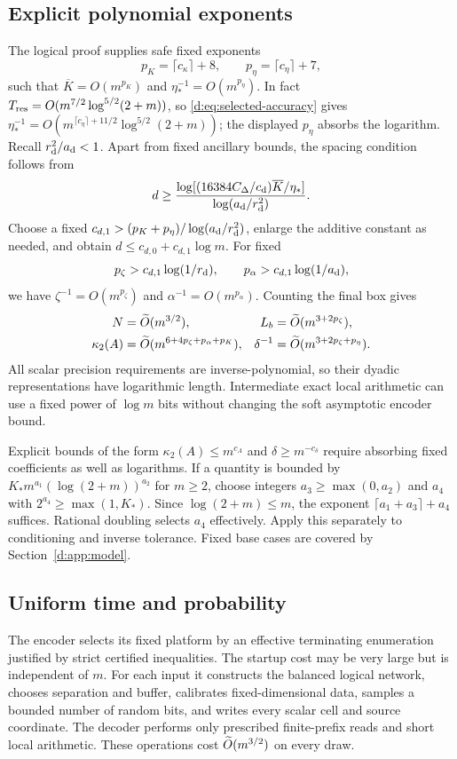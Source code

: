 \subsection{Explicit polynomial exponents}

The logical proof supplies safe fixed exponents
\[
 p_K=\lceil c_\kappa\rceil+8,\qquad
 p_\eta=\lceil c_\eta\rceil+7,
\]
such that $\overline K=O(m^{p_K})$ and
$\eta_*^{-1}=O(m^{p_\eta})$. In fact
$T_{\rm res}=O(m^{7/2}\log^{5/2}(2+m))$, so
\eqref{d:eq:selected-accuracy} gives
$\eta_*^{-1}=O(m^{\lceil c_\eta\rceil+11/2}\log^{5/2}(2+m))$;
the displayed $p_\eta$ absorbs the logarithm. Recall $r_{\rm d}^2/a_{\rm d}<1$.
Apart from fixed ancillary bounds, the spacing condition follows from
\[
 d\ge\frac{\log[(16384C_\Delta/c_{\rm d})\overline K/\eta_*]}{\log(a_{\rm d}/r_{\rm d}^2)}.
\]
Choose a fixed $c_{d,1}>(p_K+p_\eta)/\log(a_{\rm d}/r_{\rm d}^2)$, enlarge the additive constant as needed, and obtain $d\le c_{d,0}+c_{d,1}\log m$. For fixed
\[
 p_\zeta>c_{d,1}\log(1/r_{\rm d}),\qquad
 p_\alpha>c_{d,1}\log(1/a_{\rm d}),
\]
we have $\zeta^{-1}=O(m^{p_\zeta})$ and $\alpha^{-1}=O(m^{p_\alpha})$. Counting the final box gives
\begin{align}\label{d:eq:app-exponents}
 N&=\widetilde O(m^{3/2}), & L_b&=\widetilde O(m^{3+2p_\zeta}),\notag\\
 \kappa_2(A)&=\widetilde O(m^{6+4p_\zeta+p_\alpha+p_K}), &
 \delta^{-1}&=\widetilde O(m^{3+2p_\zeta+p_\eta}).
\end{align}
All scalar precision requirements are inverse-polynomial, so their dyadic representations have logarithmic length. Intermediate exact local arithmetic can use a fixed power of $\log m$ bits without changing the soft asymptotic encoder bound.

Explicit bounds of the form $\kappa_2(A)\le m^{c_A}$ and $\delta\ge m^{-c_\delta}$ require absorbing fixed coefficients as well as logarithms. If a quantity is bounded by $K_*m^{a_1}(\log(2+m))^{a_2}$ for $m\ge2$, choose integers $a_3\ge\max(0,a_2)$ and $a_4$ with $2^{a_4}\ge\max(1,K_*)$. Since $\log(2+m)\le m$, the exponent $\lceil a_1+a_3\rceil+a_4$ suffices. Rational doubling selects $a_4$ effectively. Apply this separately to conditioning and inverse tolerance. Fixed base cases are covered by Section~\ref{d:app:model}.

\subsection{Uniform time and probability}

The encoder selects its fixed platform by an effective terminating enumeration justified by strict certified inequalities. The startup cost may be very large but is independent of $m$. For each input it constructs the balanced logical network, chooses separation and buffer, calibrates fixed-dimensional data, samples a bounded number of random bits, and writes every scalar cell and source coordinate. The decoder performs only prescribed finite-prefix reads and short local arithmetic. These operations cost $\widetilde O(m^{3/2})$ on every draw.

